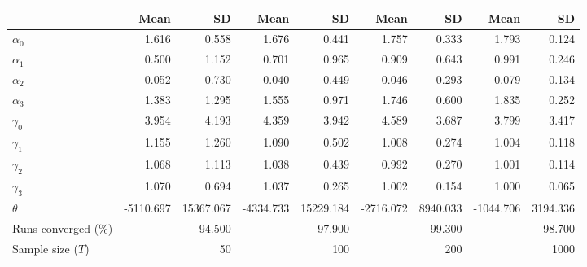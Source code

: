 
\begin{tabular}[t]{lrrrrrrrr}
\toprule
  & Mean & SD & Mean  & SD  & Mean   & SD   & Mean    & SD   \\
\midrule
$\alpha_{0}$ & 1.616 & 0.558 & 1.676 & 0.441 & 1.757 & 0.333 & 1.793 & 0.124\\
$\alpha_{1}$ & 0.500 & 1.152 & 0.701 & 0.965 & 0.909 & 0.643 & 0.991 & 0.246\\
$\alpha_{2}$ & 0.052 & 0.730 & 0.040 & 0.449 & 0.046 & 0.293 & 0.079 & 0.134\\
$\alpha_{3}$ & 1.383 & 1.295 & 1.555 & 0.971 & 1.746 & 0.600 & 1.835 & 0.252\\
$\gamma_{0}$ & 3.954 & 4.193 & 4.359 & 3.942 & 4.589 & 3.687 & 3.799 & 3.417\\
$\gamma_{1}$ & 1.155 & 1.260 & 1.090 & 0.502 & 1.008 & 0.274 & 1.004 & 0.118\\
$\gamma_{2}$ & 1.068 & 1.113 & 1.038 & 0.439 & 0.992 & 0.270 & 1.001 & 0.114\\
$\gamma_{3}$ & 1.070 & 0.694 & 1.037 & 0.265 & 1.002 & 0.154 & 1.000 & 0.065\\
$\theta$ & -5110.697 & 15367.067 & -4334.733 & 15229.184 & -2716.072 & 8940.033 & -1044.706 & 3194.336\\
Runs converged (\%) &  & 94.500 &  & 97.900 &  & 99.300 &  & 98.700\\
Sample size ($T$) &  & 50 &  & 100 &  & 200 &  & 1000\\
\bottomrule
\end{tabular}
